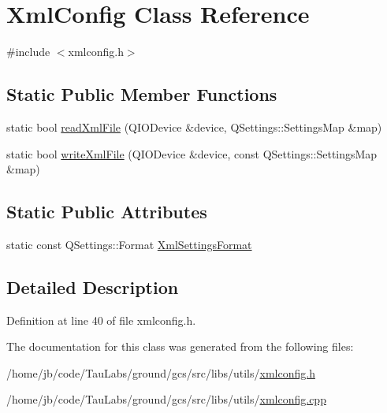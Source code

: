\hypertarget{class_xml_config}{\section{\-Xml\-Config \-Class \-Reference}
\label{class_xml_config}
}


{\ttfamily \#include $<$xmlconfig.\-h$>$}

\subsection*{\-Static \-Public \-Member \-Functions}
\begin{DoxyCompactItemize}
\item 
static bool \hyperlink{group__importexportplugin_gaaac43e2b7105e05bbc6c996a6d1e7944}{read\-Xml\-File} (\-Q\-I\-O\-Device \&device, \-Q\-Settings\-::\-Settings\-Map \&map)
\item 
static bool \hyperlink{group__importexportplugin_ga2e9b6064b59c93e1c7bebdce1a672d68}{write\-Xml\-File} (\-Q\-I\-O\-Device \&device, const \-Q\-Settings\-::\-Settings\-Map \&map)
\end{DoxyCompactItemize}
\subsection*{\-Static \-Public \-Attributes}
\begin{DoxyCompactItemize}
\item 
static const \-Q\-Settings\-::\-Format \hyperlink{group__importexportplugin_ga86ce5e7b6d81b6da071f57e2f237e9f2}{\-Xml\-Settings\-Format}
\end{DoxyCompactItemize}


\subsection{\-Detailed \-Description}


\-Definition at line 40 of file xmlconfig.\-h.



\-The documentation for this class was generated from the following files\-:\begin{DoxyCompactItemize}
\item 
/home/jb/code/\-Tau\-Labs/ground/gcs/src/libs/utils/\hyperlink{xmlconfig_8h}{xmlconfig.\-h}\item 
/home/jb/code/\-Tau\-Labs/ground/gcs/src/libs/utils/\hyperlink{xmlconfig_8cpp}{xmlconfig.\-cpp}\end{DoxyCompactItemize}
